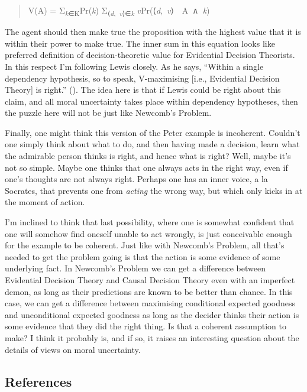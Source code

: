 \documentclass[
  11pt,
  letterpaper,
  DIV=11,
  numbers=noendperiod,
  twoside]{scrartcl}
\begin{document}
\begin{quote}
V(A) = Σ\textsubscript{\emph{k}∈K}Pr(\emph{k})
Σ\textsubscript{⟨\emph{d},~\emph{v}⟩∈\emph{k}}
\emph{v}Pr(⟨\emph{d},~\emph{v}⟩~\textbar~A~∧~\emph{k})
\end{quote}

The agent should then make true the proposition with the highest value
that it is within their power to make true. The inner sum in this
equation looks like preferred definition of decision-theoretic value for
Evidential Decision Theorists. In this respect I'm following Lewis
closely. As he says, ``Within a single dependency hypothesis, so to
speak, V-maximising {[}i.e., Evidential Decision Theory{]} is right.''
(). The idea here is that if
Lewis could be right about this claim, and all moral uncertainty takes
place within dependency hypotheses, then the puzzle here will not be
just like Newcomb's Problem.

Finally, one might think this version of the Peter example is
incoherent. Couldn't one simply think about what to do, and then having
made a decision, learn what the admirable person thinks is right, and
hence what is right? Well, maybe it's not so simple. Maybe one thinks
that one always acts in the right way, even if one's thoughts are not
always right. Perhaps one has an inner voice, a la Socrates, that
prevents one from \emph{acting} the wrong way, but which only kicks in
at the moment of action.

I'm inclined to think that last possibility, where one is somewhat
confident that one will somehow find oneself unable to act wrongly, is
just conceivable enough for the example to be coherent. Just like with
Newcomb's Problem, all that's needed to get the problem going is that
the action is some evidence of some underlying fact. In Newcomb's
Problem we can get a difference between Evidential Decision Theory and
Causal Decision Theory even with an imperfect demon, as long as their
predictions are known to be better than chance. In this case, we can get
a difference between maximising conditional expected goodness and
unconditional expected goodness as long as the decider thinks their
action is some evidence that they did the right thing. Is that a
coherent assumption to make? I think it probably is, and if so, it
raises an interesting question about the details of views on moral
uncertainty.

\subsection*{References}\label{references}
\end{document}
